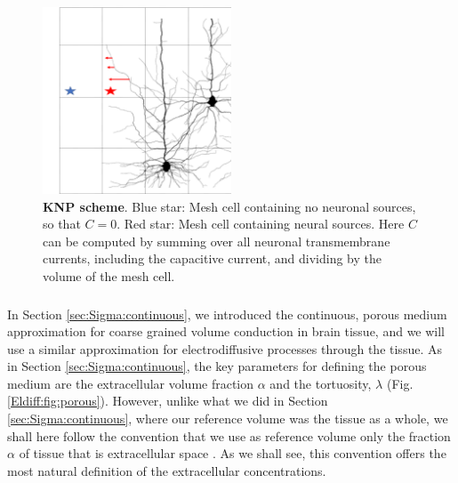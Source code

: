 \begin{figure}[!ht]
\begin{center}
\includegraphics[width=0.5\textwidth]{Figures/Eldiff/KNP.png}
\end{center}
\caption{\textbf{KNP scheme}. Blue star: Mesh cell containing no neuronal sources, so that $C=0$. Red star: Mesh cell containing neural sources. Here $C$ can be computed by summing over all neuronal transmembrane currents, including the capacitive current, and dividing by the volume of the mesh cell. }
\label{Eldiff:fig:KNPmesh}
\end{figure}


\subsubsection{}
\label{sec:Eldiff:porous}
In Section \ref{sec:Sigma:continuous}, we introduced the continuous, porous medium approximation for coarse grained volume conduction in brain tissue, and we will use a similar approximation for electrodiffusive processes through the tissue. As in Section \ref{sec:Sigma:continuous}, 
the key parameters for defining the porous medium are the extracellular volume fraction $\alpha$ and the tortuosity, $\lambda$ (Fig. \ref{Eldiff:fig:porous}). However, unlike what we did in Section \ref{sec:Sigma:continuous}, where our reference volume was the tissue as a whole, we shall here follow the convention that we use as reference volume only the fraction $\alpha$ of tissue that is extracellular space \citep{Sykova2008}. As we shall see, this convention offers the most natural definition of the extracellular concentrations. 

